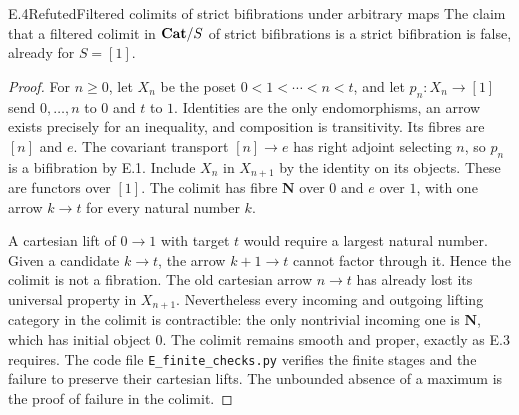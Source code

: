\begin{statement}{E.4}{Refuted}{Filtered colimits of strict bifibrations under arbitrary maps}
The claim that a filtered colimit in $\mathbf{Cat}/S$ of strict bifibrations is a strict bifibration is false, already for $S=[1]$.
\end{statement}
\begin{proof}
For $n\geq0$, let $X_n$ be the poset $0<1<\cdots<n<t$, and let $p_n:X_n\to[1]$ send $0,\ldots,n$ to $0$ and $t$ to $1$. Identities are the only endomorphisms, an arrow exists precisely for an inequality, and composition is transitivity. Its fibres are $[n]$ and $e$. The covariant transport $[n]\to e$ has right adjoint selecting $n$, so $p_n$ is a bifibration by E.1. Include $X_n$ in $X_{n+1}$ by the identity on its objects. These are functors over $[1]$. The colimit has fibre $\mathbf N$ over $0$ and $e$ over $1$, with one arrow $k\to t$ for every natural number $k$.

A cartesian lift of $0\to1$ with target $t$ would require a largest natural number. Given a candidate $k\to t$, the arrow $k+1\to t$ cannot factor through it. Hence the colimit is not a fibration. The old cartesian arrow $n\to t$ has already lost its universal property in $X_{n+1}$. Nevertheless every incoming and outgoing lifting category in the colimit is contractible: the only nontrivial incoming one is $\mathbf N$, which has initial object $0$. The colimit remains smooth and proper, exactly as E.3 requires. The code file \texttt{E\_finite\_checks.py} verifies the finite stages and the failure to preserve their cartesian lifts. The unbounded absence of a maximum is the proof of failure in the colimit.
\end{proof}

